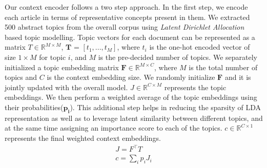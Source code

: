Our context encoder follows a two step approach. In the first step, we encode each article in terms of representative concepts present in them. We extracted 500 abstract topics from the overall corpus using \emph{Latent Dirichlet Allocation} based topic modelling. Topic vectors for each document can be represented as a matrix  $T \in \mathbb{R}^{M\times M}$, $\boldsymbol{T}$ = $[t_1,...,t_M]$, where $t_i$ is the one-hot encoded vector of size $1 \times M$ for topic $i$, and $M$ is the pre-decided number of topics. We separately initialized a topic embedding matrix $\boldsymbol{F} \in \mathbb{R}^{M\times C}$, where $M$ is the total number of topics and  $C$ is the context embedding size. We randomly initialize $\boldsymbol{F}$ and it is jointly updated with the overall model. $J \in \mathbb{R}^{C\times M}$ represents the topic embeddings. We then perform a weighted average of the topic embeddings using their probabilities($\boldsymbol{p_i}$). This additional step helps in reducing the sparsity of LDA representation as well as to leverage latent similarity between different topics, and at the same time assigning an importance score to each of the topics. $c \in \mathbb{R}^{C\times 1}$ represents the final weighted context embeddings.
\vspace{-1mm}
\begin{eqnarray}
J =  F^\intercal T \\
c = \sum\limits_{i} p_i J_i
\label{eq3}
\end{eqnarray}
\vspace{-3mm}
